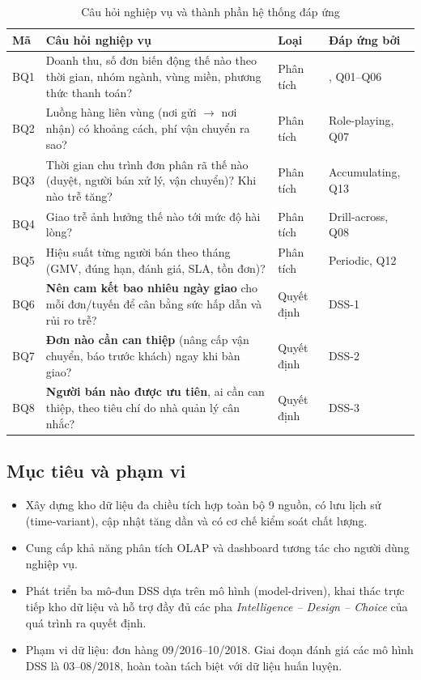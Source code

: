\documentclass[a4paper]{article}
\DeclareRobustCommand{\code}[1]{\texttt{\detokenize{#1}}}
\newcommand{\thead}[1]{\textbf{#1}}
\begin{document}
\begin{table}[!htbp]
\centering
\caption{Câu hỏi nghiệp vụ và thành phần hệ thống đáp ứng}
\label{tab:bq}
\small
\begin{tabularx}{\textwidth}{@{}l Y l l@{}}
\toprule
\thead{Mã} & \thead{Câu hỏi nghiệp vụ} & \thead{Loại} & \thead{Đáp ứng bởi} \\
\midrule
BQ1 & Doanh thu, số đơn biến động thế nào theo thời gian, nhóm ngành, vùng miền, phương thức thanh toán? & Phân tích & \code{fact_sales}, Q01--Q06 \\
BQ2 & Luồng hàng liên vùng (nơi gửi $\rightarrow$ nơi nhận) có khoảng cách, phí vận chuyển ra sao? & Phân tích & Role-playing, Q07 \\
BQ3 & Thời gian chu trình đơn phân rã thế nào (duyệt, người bán xử lý, vận chuyển)? Khi nào trễ tăng? & Phân tích & Accumulating, Q13 \\
BQ4 & Giao trễ ảnh hưởng thế nào tới mức độ hài lòng? & Phân tích & Drill-across, Q08 \\
BQ5 & Hiệu suất từng người bán theo tháng (GMV, đúng hạn, đánh giá, SLA, tồn đơn)? & Phân tích & Periodic, Q12 \\
BQ6 & \textbf{Nên cam kết bao nhiêu ngày giao} cho mỗi đơn/tuyến để cân bằng sức hấp dẫn và rủi ro trễ? & Quyết định & DSS-1 \\
BQ7 & \textbf{Đơn nào cần can thiệp} (nâng cấp vận chuyển, báo trước khách) ngay khi bàn giao? & Quyết định & DSS-2 \\
BQ8 & \textbf{Người bán nào được ưu tiên}, ai cần can thiệp, theo tiêu chí do nhà quản lý cân nhắc? & Quyết định & DSS-3 \\
\bottomrule
\end{tabularx}
\end{table}

\subsection{Mục tiêu và phạm vi}
\begin{itemize}
    \item Xây dựng kho dữ liệu đa chiều tích hợp toàn bộ 9 nguồn, có lưu lịch sử (time-variant), cập nhật tăng dần và có cơ chế kiểm soát chất lượng.
    \item Cung cấp khả năng phân tích OLAP và dashboard tương tác cho người dùng nghiệp vụ.
    \item Phát triển ba mô-đun DSS dựa trên mô hình (model-driven), khai thác trực tiếp kho dữ liệu và hỗ trợ đầy đủ các pha \textit{Intelligence -- Design -- Choice} của quá trình ra quyết định.
    \item Phạm vi dữ liệu: đơn hàng 09/2016--10/2018. Giai đoạn đánh giá các mô hình DSS là 03--08/2018, hoàn toàn tách biệt với dữ liệu huấn luyện.
\end{itemize}
\end{document}
